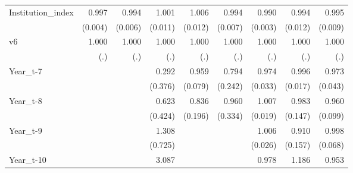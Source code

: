 \begin{table}[htbp]
\begin{tabular}{l*{8}{D{.}{.}{-1}}}
Institution\_index   &       0.997         &       0.994         &       1.001         &       1.006         &       0.994         &       0.990\sym{***}&       0.994         &       0.995         \\
                    &     (0.004)         &     (0.006)         &     (0.011)         &     (0.012)         &     (0.007)         &     (0.003)         &     (0.012)         &     (0.009)         \\
v6                  &       1.000         &       1.000         &       1.000         &       1.000         &       1.000         &       1.000         &       1.000         &       1.000         \\
                    &         (.)         &         (.)         &         (.)         &         (.)         &         (.)         &         (.)         &         (.)         &         (.)         \\
Year\_t-7            &                     &                     &       0.292         &       0.959         &       0.794         &       0.974         &       0.996         &       0.973         \\
                    &                     &                     &     (0.376)         &     (0.079)         &     (0.242)         &     (0.033)         &     (0.017)         &     (0.043)         \\
Year\_t-8            &                     &                     &       0.623         &       0.836         &       0.960         &       1.007         &       0.983         &       0.960         \\
                    &                     &                     &     (0.424)         &     (0.196)         &     (0.334)         &     (0.019)         &     (0.147)         &     (0.099)         \\
Year\_t-9            &                     &                     &       1.308         &                     &                     &       1.006         &       0.910         &       0.998         \\
                    &                     &                     &     (0.725)         &                     &                     &     (0.026)         &     (0.157)         &     (0.068)         \\
Year\_t-10           &                     &                     &       3.087         &                     &                     &       0.978         &       1.186         &       0.953         \\

\end{tabular}
\end{table}
